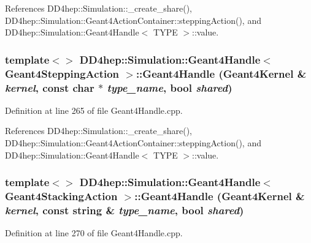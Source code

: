 References DD4hep::Simulation::\_\-create\_\-share(), DD4hep::Simulation::Geant4ActionContainer::steppingAction(), and DD4hep::Simulation::Geant4Handle$<$ TYPE $>$::value.\hypertarget{class_d_d4hep_1_1_simulation_1_1_geant4_handle_af91d192bb9b5720390e823ae31838c8a}{
\subsubsection[{Geant4Handle}]{\setlength{\rightskip}{0pt plus 5cm}template$<$$>$ {\bf DD4hep::Simulation::Geant4Handle}$<$ {\bf Geant4SteppingAction} $>$::{\bf Geant4Handle} ({\bf Geant4Kernel} \& {\em kernel}, \/  const char $\ast$ {\em type\_\-name}, \/  bool {\em shared})}}
\label{class_d_d4hep_1_1_simulation_1_1_geant4_handle_af91d192bb9b5720390e823ae31838c8a}


Definition at line 265 of file Geant4Handle.cpp.

References DD4hep::Simulation::\_\-create\_\-share(), DD4hep::Simulation::Geant4ActionContainer::steppingAction(), and DD4hep::Simulation::Geant4Handle$<$ TYPE $>$::value.\hypertarget{class_d_d4hep_1_1_simulation_1_1_geant4_handle_a436ab2989350f1b7b5400284bf3dcc4e}{
\subsubsection[{Geant4Handle}]{\setlength{\rightskip}{0pt plus 5cm}template$<$$>$ {\bf DD4hep::Simulation::Geant4Handle}$<$ {\bf Geant4StackingAction} $>$::{\bf Geant4Handle} ({\bf Geant4Kernel} \& {\em kernel}, \/  const {\bf string} \& {\em type\_\-name}, \/  bool {\em shared})}}
\label{class_d_d4hep_1_1_simulation_1_1_geant4_handle_a436ab2989350f1b7b5400284bf3dcc4e}


Definition at line 270 of file Geant4Handle.cpp.

